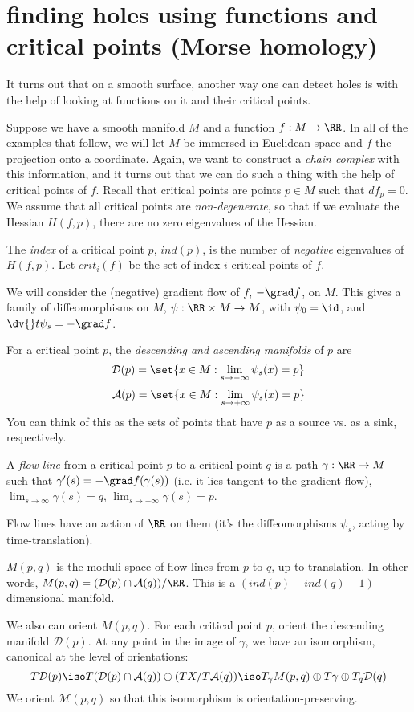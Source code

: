 \documentclass[12pt]{article}
\begin{document}
\section{finding holes using functions and critical points (Morse homology)}
It turns out that on a smooth surface, another way one can detect holes is with
the help of looking at functions on it and their critical points. 

Suppose we have a smooth manifold $M$ and a function $f : M \to \RR$. In all of
the examples that follow, we
will let $M$ be immersed in Euclidean space and $f$ the projection onto a
coordinate. Again, we want to construct a \emph{chain complex} with this
information, and it turns out that we can do such a thing with the help of
critical points of $f$. Recall that critical points are points $p \in M$ such
that $df_p = 0$. We assume that all critical points are \emph{non-degenerate},
so that if we evaluate the Hessian $H(f, p)$, there are no zero eigenvalues of
the Hessian. 
\begin{definition*}
  The \emph{index} of a critical point $p$, $ind(p)$, is the number of
  \emph{negative} eigenvalues of $H(f, p)$. Let $crit_i(f)$ be the set of index
  $i$ critical points of $f$. 
\end{definition*}
We will consider the (negative) gradient flow of $f$, $- \grad f$, on $M$. This
gives a family of diffeomorphisms on $M$, $\psi: \RR \times  M \to M$, with
$\psi_0 = \id$, and $\dv{}t \psi_s = -\grad f$. 
\begin{definition*}
  For a critical point $p$, the \emph{descending and ascending manifolds} of $p$ are 
\[
  \mathcal D(p) = \set{x \in M : \lim_{s\to -\infty} \psi_s(x) = p}
\] 
\[
  \mathcal A(p) = \set{x \in M : \lim_{s\to +\infty} \psi_s(x) = p}
\]
You can think of this as the sets of points that have $p$ as a source vs. as a
sink, respectively. 
\end{definition*}
\begin{definition*}
  A \emph{flow line} from a critical point $p$ to a critical point $q$ is a path
  $\gamma : \RR \to M$ such that $\gamma'(s) = -\grad f(\gamma(s))$ (i.e. it
  lies tangent to the gradient flow), $\lim_{s\to \infty} \gamma(s) = q$,
  $\lim_{s\to -\infty} \gamma(s) = p$. 
\end{definition*}
Flow lines have an action of $\RR$ on them (it's the diffeomorphisms $\psi_s$,
acting by time-translation). 
\begin{definition*}
  $M(p, q)$ is the moduli space of flow lines from $p$ to $q$, up to
  translation. In other words, $M(p, q) = (\mathcal D(p) \cap \mathcal A(q)) /
  \RR$. This is a $(ind(p) - ind(q) - 1)$-dimensional manifold.
\end{definition*}
We also can orient $M(p, q)$. For each critical point $p$, orient the descending
manifold $\mathcal D(p)$. At any point in the image of $\gamma$, we have an
isomorphism, canonical at the level of orientations: 
\[
 T\mathcal D(p) \iso T(\mathcal D(p) \cap \mathcal A(q)) \oplus (TX / T\mathcal
 A(q)) \iso T_\gamma M(p, q) \oplus T\gamma \oplus T_q \mathcal D(q)
\]
We orient $\mathcal M(p, q)$ so that this isomorphism is orientation-preserving.
\end{document}
